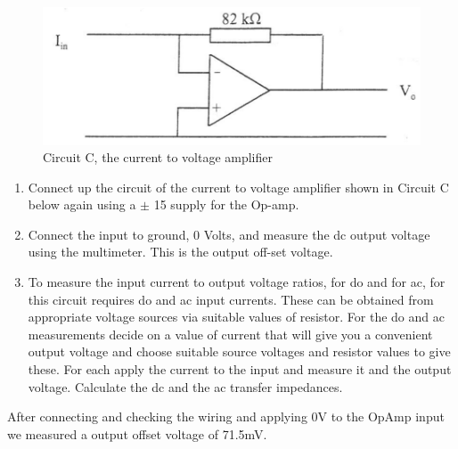 \begin{figure}[H] %
\begin{center}
\includegraphics[width=1\linewidth]{LabTwo/c}
\end{center}
\caption{Circuit C, the current to voltage amplifier}
\label{fig:2_currentToVoltage}
\end{figure}


\begin{enumerate}
	\item Connect up the circuit of the current to voltage amplifier shown in Circuit C below again using a $\pm$ 15 supply for the Op-amp.

	\item Connect the input to ground, 0 Volts, and measure the dc output voltage using the multimeter. This is the output off-set voltage.

	\item To measure the input current to output voltage ratios, for do and for ac, for this circuit
requires do and ac input currents. These can be obtained from appropriate voltage sources
via suitable values of resistor. For the do and ac measurements decide on a value of current
that will give you a convenient output voltage and choose suitable source voltages and
resistor values to give these. For each apply the current to the input and measure it and the
output voltage. Calculate the dc and the ac transfer impedances.

\end{enumerate}

%
After connecting and checking the wiring and applying 0V to the OpAmp input we measured a output offset voltage of 71.5mV.

